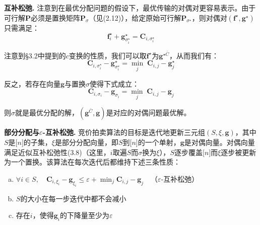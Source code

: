 \documentclass[cn,10pt,math=newtx,citestyle=gb7714-2015,bibstyle=gb7714-2015]{elegantbook}
\begin{document}
\vspace{.6em}

\textbf{互补松弛.} 注意到在最优分配问题的假设下，最优传输的对偶对更容易表示。由于可行解$\mathbf{P}$必须是置换矩阵$\mathbf{P}_\sigma$（见(2.12)），给定原始可行解$\mathbf{P}_{\sigma^\star}$，则对偶对$(\mathbf{f}^\star, \mathbf{g}^\star)$只需满足：
\begin{equation*}
    \mathbf{f}^\star_i + \mathbf{g}^\star_{\sigma^\star_i} = \mathbf{C}_{i,\sigma^\star_i}
\end{equation*}

注意到\S 3.2中提到的$c$变换的性质，我们可以取$\mathbf{f}^\star$为$\mathbf{g}^{\star \bar C}$，从而我们有：
\begin{equation}
    \label{3.7}
     \mathbf{C}_{i,\sigma^\star_i} - \mathbf{g}^\star_{\sigma^\star_i} = \min\limits_j\; \mathbf{C}_{i,j} - \mathbf{g}^\star_{j}
\end{equation}

反之，若存在向量$\mathbf{g}$与置换$\sigma$使得下式成立：
\begin{equation}
    \label{3.8}
     \mathbf{C}_{i,\sigma_i} - \mathbf{g}_{\sigma_i} = \min\limits_j\; \mathbf{C}_{i,j} - \mathbf{g}_{j}
\end{equation}

则$\sigma$就是最优分配的解，$(\mathbf{g}^{\bar C},\mathbf{g})$是对应的对偶问题最优解。

\vspace{.6em}

\textbf{部分分配与$\varepsilon$-互补松弛.} 竞价拍卖算法的目标是迭代地更新三元组$(S,\xi,\mathbf{g})$，其中$S$是$\mathbb{[}n\mathbb{]}$的子集，$\xi$是部分分配向量，即$S$到$\mathbb{[}n\mathbb{]}$的一个单射，$\mathbf{g}$是对偶向量。对偶向量满足近似互补松弛性(3.8)（这里，$i$取遍$S$而$\sigma$换为$\xi$），$S$逐步覆盖$\mathbb{[}n\mathbb{]}$而$\xi$逐步被更新为一个置换。该算法在每次迭代后都维持下述三条性质：

\begin{enumerate}[(a)]
    \item $\forall i\in S,\quad \mathbf{C}_{i,\xi_i} - \mathbf{g}_{\xi_i}\leq \varepsilon + \min_j \mathbf{C}_{i,j} - \mathbf{g}_j$\ \ （$\varepsilon$-互补松弛）
    \item $S$的大小在每一步迭代中都不会减小
    \item 存在$i$，使得$\mathbf{g}_i$的下降量至少为$\varepsilon$
\end{enumerate}

\vspace{.6em}
\end{document}

